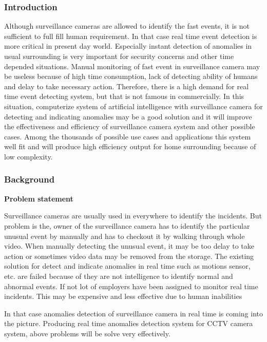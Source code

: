 \documentclass[
]{article}
\author{}
\date{}
\begin{document}
\hypertarget{introduction}{%
\subsubsection{Introduction}\label{introduction}}

Although surveillance cameras are allowed to identify the fast events,
it is not sufficient to full fill human requirement. In that case real
time event detection is more critical in present day world. Especially
instant detection of anomalies in usual surrounding is very important
for security concerns and other time depended situations. Manual
monitoring of fast event in surveillance camera may be useless because
of high time consumption, lack of detecting ability of humans and delay
to take necessary action. Therefore, there is a high demand for real
time event detecting system, but that is not famous in commercially. In
this situation, computerize system of artificial intelligence with
surveillance camera for detecting and indicating anomalies may be a good
solution and it will improve the effectiveness and efficiency of
surveillance camera system and other possible cases. Among the thousands
of possible use cases and applications this system well fit and will
produce high efficiency output for home surrounding because of low
complexity.

\hypertarget{background}{%
\subsubsection{Background}\label{background}}

\textbf{Problem statement}

Surveillance cameras are usually used in everywhere to identify the
incidents. But problem is the, owner of the surveillance camera has to
identify the particular unusual event by manually and has to checkout it
by walking through whole video. When manually detecting the unusual
event, it may be too delay to take action or sometimes video data may be
removed from the storage. The existing solution for detect and indicate
anomalies in real time such as motions sensor, etc. are failed because
of they are not intelligence to identify normal and abnormal events. If
not lot of employers have been assigned to monitor real time incidents.
This may be expensive and less effective due to human inabilities

In that case anomalies detection of surveillance camera in real time is
coming into the picture. Producing real time anomalies detection system
for CCTV camera system, above problems will be solve very effectively.
\end{document}
